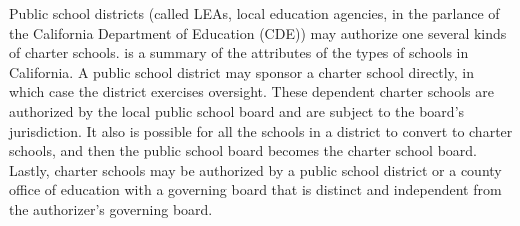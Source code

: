 Public school districts (called LEAs, local education agencies, in the parlance of the California Department of Education (CDE)) may authorize one several kinds of charter schools.  is a summary of the attributes of the types of schools in California. A public school district may sponsor a charter school directly, in which case the district exercises oversight. These dependent charter schools are authorized by the local public school board and are subject to the board's jurisdiction. It also is possible for all the schools in a district to convert to charter schools, and then the public school board becomes the charter school board. Lastly, charter schools may be authorized by a public school district or a county office of education with a governing board that is distinct and independent from the authorizer's governing board.

